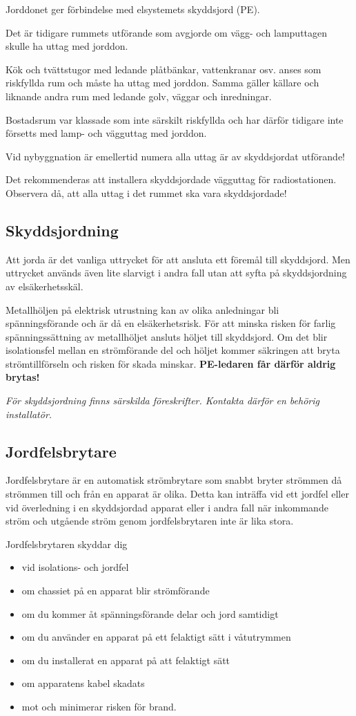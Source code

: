 Jorddonet ger förbindelse med elsystemets skyddsjord (PE).

Det är tidigare rummets utförande som avgjorde om vägg- och lamputtagen skulle
ha uttag med jorddon.

Kök och tvättstugor med ledande plåtbänkar, vattenkranar osv. anses som
riskfyllda rum och måste ha uttag med jorddon.
Samma gäller källare och liknande andra rum med ledande golv, väggar och
inredningar.

Bostadsrum var klassade som inte särskilt riskfyllda och har därför tidigare
inte försetts med lamp- och vägguttag med jorddon.

Vid nybyggnation är emellertid numera alla uttag är av skyddsjordat utförande!

Det rekommenderas att installera skyddsjordade vägguttag för radiostationen.
Observera då, att alla uttag i det rummet ska vara skyddsjordade!

\subsection{Skyddsjordning}

Att jorda är det vanliga uttrycket för att ansluta ett föremål till skyddsjord.
Men uttrycket används även lite slarvigt i andra fall utan att syfta på
skyddsjordning av elsäkerhetsskäl.

Metallhöljen på elektrisk utrustning kan av olika anledningar bli
spänningsförande och är då en elsäkerhetsrisk.
För att minska risken för farlig spänningssättning av metallhöljet ansluts
höljet till skyddsjord.
Om det blir isolationsfel mellan en strömförande del och höljet kommer
säkringen att bryta strömtillförseln och risken för skada minskar.
\textbf{PE-ledaren får därför aldrig brytas!}

\emph{För skyddsjordning finns särskilda föreskrifter.
  Kontakta därför en behörig installatör.}

\subsection{Jordfelsbrytare}

Jordfelsbrytare är en automatisk strömbrytare som snabbt bryter strömmen
då strömmen till och från en apparat är olika.
Detta kan inträffa vid ett jordfel eller vid överledning i en skyddsjordad
apparat eller i andra fall när inkommande ström och utgående ström genom
jordfelsbrytaren inte är lika stora.

Jordfelsbrytaren skyddar dig
\begin{itemize}
\item vid isolations- och jordfel
\item om chassiet på en apparat blir strömförande
\item om du kommer åt spänningsförande delar och jord samtidigt
\item om du använder en apparat på ett felaktigt sätt i våtutrymmen
\item om du installerat en apparat på att felaktigt sätt
\item om apparatens kabel skadats
\item mot och minimerar risken för brand.
\end{itemize}


